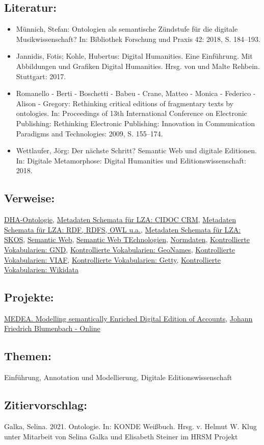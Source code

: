 \documentclass{article}
\begin{document}
        \subsection*{Literatur:}\begin{itemize}\item Münnich, Stefan: Ontologien als semantische Zündstufe für die digitale Musikwissenschaft? In: Bibliothek Forschung und Praxis 42: 2018, S. 184–193.\item Jannidis, Fotis; Kohle, Hubertus: Digital Humanities. Eine Einführung. Mit Abbildungen und Grafiken Digital Humanities. Hrsg. von  und Malte Rehbein. Stuttgart: 2017.\item Romanello - Berti - Boschetti - Babeu - Crane, Matteo - Monica - Federico - Alison - Gregory: Rethinking critical editions of fragmentary texts by ontologies. In: Proceedings of 13th International Conference on Electronic Publishing: Rethinking Electronic Publishing: Innovation in Communication Paradigms and Technologies: 2009, S. 155–174.\item Wettlaufer, Jörg: Der nächste Schritt? Semantic Web und digitale Editionen. In: Digitale Metamorphose: Digital Humanities und Editionswissenschaft: 2018.\end{itemize}\subsection*{Verweise:}\href{https://gams.uni-graz.at/o:konde.5}{DHA-Ontologie}, \href{https://gams.uni-graz.at/o:konde.133}{Metadaten Schemata für LZA: CIDOC CRM}, \href{https://gams.uni-graz.at/o:konde.131}{Metadaten Schemata für LZA: RDF, RDFS, OWL u.a.}, \href{https://gams.uni-graz.at/o:konde.132}{Metadaten Schemata für LZA: SKOS}, \href{https://gams.uni-graz.at/o:konde.167}{Semantic Web}, \href{https://gams.uni-graz.at/o:konde.168}{Semantic Web TEchnologien}, \href{https://gams.uni-graz.at/o:konde.147}{Normdaten}, \href{https://gams.uni-graz.at/o:konde.109}{Kontrollierte Vokabularien: GND}, \href{https://gams.uni-graz.at/o:konde.107}{Kontrollierte Vokabularien: GeoNames}, \href{https://gams.uni-graz.at/o:konde.111}{Kontrollierte Vokabularien: VIAF}, \href{https://gams.uni-graz.at/o:konde.108}{Kontrollierte Vokabularien: Getty}, \href{https://gams.uni-graz.at/o:konde.112}{Kontrollierte Vokabularien: Wikidata}\subsection*{Projekte:}\href{https://medea.hypotheses.org}{MEDEA. Modelling semantically Enriched Digital Edition of Accounts}, \href{http://www.blumenbach-online.de}{Johann Friedrich Blumenbach - Online}\subsection*{Themen:}Einführung, Annotation und Modellierung, Digitale Editionswissenschaft\subsection*{Zitiervorschlag:}Galka, Selina. 2021. Ontologie. In: KONDE Weißbuch. Hrsg. v. Helmut W. Klug unter Mitarbeit von Selina Galka und Elisabeth Steiner im HRSM Projekt 
\end{document}
